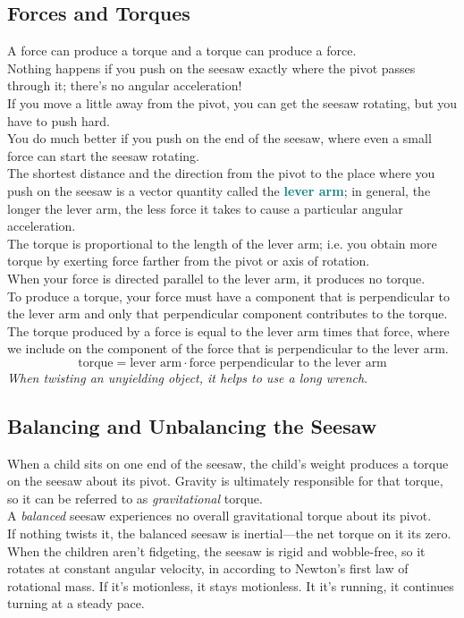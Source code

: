 \documentclass[12pt]{article}
\theoremstyle{definition}
\newcommand{\defnterm}[1]{\textbf{\textcolor{teal}{#1}}\index{#1}}
\begin{document}
\subsection{Forces and Torques}
A force can produce a torque and a torque can produce a force. \\

Nothing happens if you push on the seesaw exactly where the pivot passes through it;
there's no angular acceleration! \\
If you move a little away from the pivot, you can get the seesaw rotating, but you have to push hard. \\
You do much better if you push on the end of the seesaw, where even a small force can start the seesaw rotating. \\
The shortest distance and the direction from the pivot to the place where you push on the seesaw is a vector quantity called the \defnterm{lever arm};
in general, the longer the lever arm, the less force it takes to cause a particular angular acceleration. \\
The torque is proportional to the length of the lever arm;
i.e. you obtain more torque by exerting force farther from the pivot or axis of rotation. \\

When your force is directed parallel to the lever arm, it produces no torque. \\
To produce a torque, your force must have a component that is perpendicular to the lever arm and only that perpendicular component contributes to the torque. \\

The torque produced by a force is equal to the lever arm times that force, where we include on the component of the force that is perpendicular to the lever arm.
$$\text{torque} = \text{lever arm} \cdot \text{force perpendicular to the lever arm}$$
\emph{When twisting an unyielding object, it helps to use a long wrench}.

\subsection{Balancing and Unbalancing the Seesaw}
When a child sits on one end of the seesaw, the child's weight produces a torque on the seesaw about its pivot.
Gravity is ultimately responsible for that torque, so it can be referred to as \emph{gravitational} torque. \\

A \emph{balanced} seesaw experiences no overall gravitational torque about its pivot. \\
If nothing twists it, the balanced seesaw is inertial---the net torque on it its zero. \\
When the children aren't fidgeting, the seesaw is rigid and wobble-free, so it rotates at constant angular velocity, in according to Newton's first law of rotational mass.
If it's motionless, it stays motionless.
It it's running, it continues turning at a steady pace. \\
\end{document}
